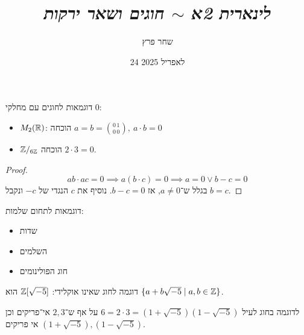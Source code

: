\documentclass[]{../../../../tex/classes/styledArticle}
\author{שחר פרץ}
\title{\textit{לינארית 2א $\sim$ חוגים ושאר ירקות}}
\date{24 לאפריל 2025}
\begin{document}
	\maketitle
	\section{}
	
	דוגמאות לחוגים עם מחלקי $0$: 
	\begin{itemize}
		\item $M_2(\mathbb{R})$: הוכחה $a = b = \binom{0\, 1}{0\, 0}, \ a \cdot b = 0$
		\item $\mathbb{Z}/_{6\mathbb{Z}}$ הוכחה $2 \cdot 3 = 0$. 
	\end{itemize}
	
	\begin{proof}
		\[ ab  \cdot ac = 0 \implies a(b \cdot c) = 0 \implies a = 0 \lor b - c = 0 \]
		בגלל ש־$a \neq 0$, אז $b - c = 0$. נוסיף את $c$ הנגדי של $-c$ ונקבל $b = c$. 
	\end{proof}
	
	דוגמאות לתחום שלמות: 
	\begin{itemize}
		\item שדות
		\item השלמים
		\item חוג הפולינומים
	\end{itemize}
	
	
	
	
	דוגמה לחוג שאינו אוקלידי: $\mathbb{Z}[\sqrt{-5}]$ הוא $\{a + b\sqrt{-5} \mid a, b \in \mathbb{Z}\}$. 
		
		
		לדוגמה בחוג לעיל $6 = 2 \cdot 3 = (1 + \sqrt{-5})(1 - \sqrt{-5})$ על אף ש־$2, 3$ אי־פריקים וכן $(1 + \sqrt{-5}), (1  - \sqrt{-5})$ אי פריקים. 
		
\end{document}
